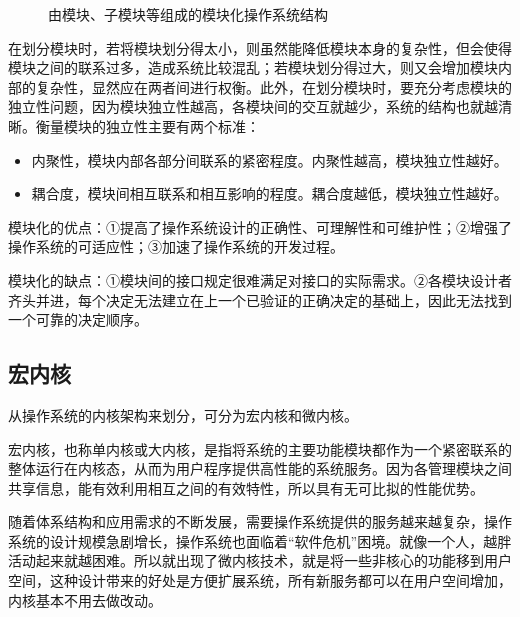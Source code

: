 \documentclass{ctexbook}
\begin{document}
	\begin{figure}[h]
		\centering
		\caption{由模块、子模块等组成的模块化操作系统结构}
	\end{figure}
		
		在划分模块时，若将模块划分得太小，则虽然能降低模块本身的复杂性，但会使得模块之间的联系过多，造成系统比较混乱；若模块划分得过大，则又会增加模块内部的复杂性，显然应在两者间进行权衡。此外，在划分模块时，要充分考虑模块的独立性问题，因为模块独立性越高，各模块间的交互就越少，系统的结构也就越清晰。衡量模块的独立性主要有两个标准：
		\begin{itemize}
			\item 内聚性，模块内部各部分间联系的紧密程度。内聚性越高，模块独立性越好。
			\item 耦合度，模块间相互联系和相互影响的程度。耦合度越低，模块独立性越好。
		\end{itemize}
		
		模块化的优点：①提高了操作系统设计的正确性、可理解性和可维护性；②增强了操作系统的可适应性；③加速了操作系统的开发过程。
		
		模块化的缺点：①模块间的接口规定很难满足对接口的实际需求。②各模块设计者齐头并进，每个决定无法建立在上一个已验证的正确决定的基础上，因此无法找到一个可靠的决定顺序。
		
		\subsection{宏内核}
		从操作系统的内核架构来划分，可分为宏内核和微内核。
		
		宏内核，也称单内核或大内核，是指将系统的主要功能模块都作为一个紧密联系的整体运行在内核态，从而为用户程序提供高性能的系统服务。因为各管理模块之间共享信息，能有效利用相互之间的有效特性，所以具有无可比拟的性能优势。
		
		随着体系结构和应用需求的不断发展，需要操作系统提供的服务越来越复杂，操作系统的设计规模急剧增长，操作系统也面临着“软件危机”困境。就像一个人，越胖活动起来就越困难。所以就出现了微内核技术，就是将一些非核心的功能移到用户空间，这种设计带来的好处是方便扩展系统，所有新服务都可以在用户空间增加，内核基本不用去做改动。
		
\end{document}
